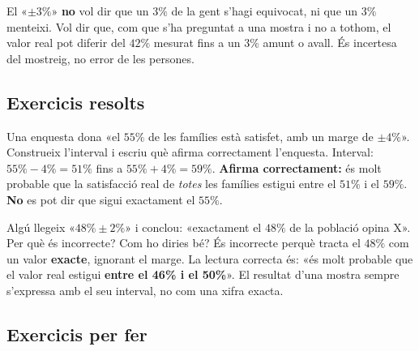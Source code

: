 \begin{exemple}
El «$\pm 3\%$» \textbf{no} vol dir que un $3\%$ de la gent s'hagi equivocat, ni que un $3\%$
menteixi. Vol dir que, com que s'ha preguntat a una mostra i no a tothom, el valor real pot
diferir del $42\%$ mesurat fins a un $3\%$ amunt o avall. És incertesa del mostreig, no
error de les persones.
\end{exemple}

\subsection{Exercicis resolts}

\begin{exresolt}
Una enquesta dona «el $55\%$ de les famílies està satisfet, amb un marge de $\pm 4\%$».
Construeix l'interval i escriu què afirma correctament l'enquesta.
\solucio
Interval: $55\%-4\%=51\%$ fins a $55\%+4\%=59\%$. \textbf{Afirma correctament:} és molt
probable que la satisfacció real de \emph{totes} les famílies estigui entre el $51\%$ i el
$59\%$. \textbf{No} es pot dir que sigui exactament el $55\%$.
\end{exresolt}

\begin{exresolt}
Algú llegeix «$48\%\pm 2\%$» i conclou: «exactament el $48\%$ de la població opina X».
Per què és incorrecte? Com ho diries bé?
\solucio
És incorrecte perquè tracta el $48\%$ com un valor \textbf{exacte}, ignorant el marge. La
lectura correcta és: «és molt probable que el valor real estigui \textbf{entre el 46\% i el
50\%}». El resultat d'una mostra sempre s'expressa amb el seu interval, no com una xifra
exacta.
\end{exresolt}

\subsection{Exercicis per fer}

